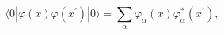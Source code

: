\begin{equation}
\langle 0|\varphi (x)\varphi (x^{\prime })|0\rangle =\sum_{\alpha }\varphi
_{\alpha }(x)\varphi _{\alpha }^{\ast }(x^{\prime }),  \label{mfieldmodesum}
\end{equation}


